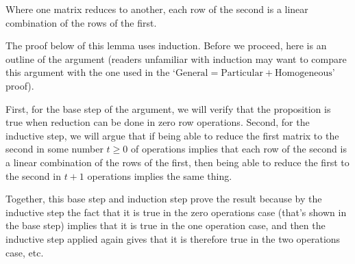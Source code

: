 \begin{corollary} \label{cor:RowsOfEqMatsLinCombos}
Where one matrix reduces to another, each row of the second
is a linear combination of the rows of the first.
\end{corollary}

The proof below of this lemma
uses induction.
Before we proceed, here is an outline of the argument
(readers unfamiliar with induction may want to compare this argument with the
one used in the 
`$\text{General}=\text{Particular}+\text{Homogeneous}$' 
proof). %

First, for the base step of the argument, we
will verify that the proposition is true when reduction 
can be done in zero row operations.
Second, for the inductive step, we will 
argue that if being able to reduce the first matrix to the second in some
number $t\geq 0$ of operations implies that each row of the second is a linear
combination of the rows of the first, then being able to reduce the first to
the second in $t+1$ operations implies the same thing.

Together, this base step and induction step prove the result because  
by the inductive step the fact that it is true in the zero operations case
(that's shown in the base step)
implies that it is true in the one operation case, and then the inductive step
applied again gives that it is therefore true in the two operations case, etc.

